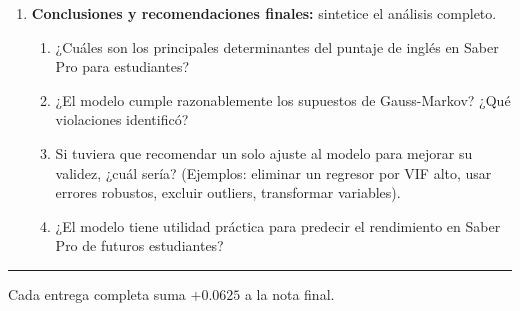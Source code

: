\documentclass[11pt, a4paper]{article}
\begin{document}
\begin{enumerate}[label=\arabic*)]
  \item \textbf{Conclusiones y recomendaciones finales:} sintetice el
        an\'alisis completo.
        \begin{enumerate}[label=\alph*)]
          \item ¿Cu\'ales son los principales determinantes del puntaje de
                ingl\'es en Saber Pro para estudiantes?
          \item ¿El modelo cumple razonablemente los supuestos de Gauss-Markov?
                ¿Qu\'e violaciones identific\'o?
          \item Si tuviera que recomendar un solo ajuste al modelo para
                mejorar su validez, ¿cu\'al ser\'ia? (Ejemplos: eliminar un
                regresor por VIF alto, usar errores robustos, excluir outliers,
                transformar variables).
          \item ¿El modelo tiene utilidad pr\'actica para predecir el
                rendimiento en Saber Pro de futuros estudiantes?
        \end{enumerate}
\end{enumerate}

\vspace{10pt}
\rule{\linewidth}{0.4pt}
\begin{center}
{\small Cada entrega completa suma $+0.0625$ a la nota final.}
\end{center}
\end{document}
